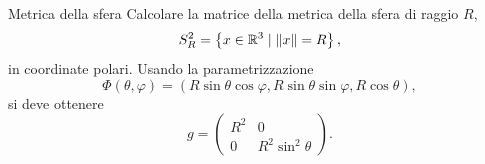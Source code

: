\documentclass[a4paper]{article}
\begin{document}
\begin{snippetexercise}{Metrica della sfera}
    Calcolare la matrice della metrica della sfera di raggio \(R\),
    \[
        S^2_R=\left\{x\in\mathbb{R}^3\mid \|x\|=R\right\},
    \]
    in coordinate polari. Usando la parametrizzazione
    \[
        \Phi(\theta,\varphi)
        =
        \left(
            R\sin\theta\cos\varphi,
            R\sin\theta\sin\varphi,
            R\cos\theta
        \right),
    \]
    si deve ottenere
    \[
        g
        =
        \begin{pmatrix}
            R^2 & 0\\
            0 & R^2\sin^2\theta
        \end{pmatrix}.
    \]
\end{snippetexercise}
\end{document}

